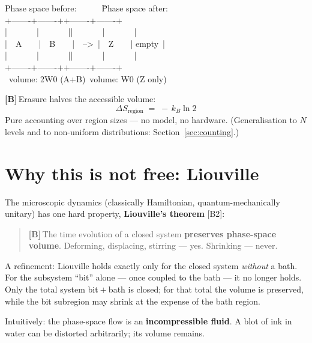 \documentclass[11pt,a4paper]{article}
\newcommand{\LB}{\textcolor{layB}{\textbf{\footnotesize\textsf{[B]}}}\,}
\begin{document}
\begin{center}
\begin{minipage}{0.78\textwidth}
\ttfamily\small
\begin{tabbing}
Phase space before:\ \ \ \ \ \ \=Phase space after:\\[0.3em]
+-------+-------+\>+-------+-------+\\
|\ \ \ \ \ \ \ |\ \ \ \ \ \ \ |\>|\ \ \ \ \ \ \ |\ \ \ \ \ \ \ |\\
|\ \ A\ \ \ \ |\ \ B\ \ \ \ |\ \ -->\ \>|\ \ Z\ \ \ \ | empty\ |\\
|\ \ \ \ \ \ \ |\ \ \ \ \ \ \ |\>|\ \ \ \ \ \ \ |\ \ \ \ \ \ \ |\\
+-------+-------+\>+-------+-------+\\
\ volume: 2W0 (A+B)\>\ volume: W0 (Z only)
\end{tabbing}
\end{minipage}
\end{center}

\LB Erasure halves the accessible volume:
\[
  \Delta S_{\text{region}} \;=\; -\,k_B \ln 2
\]
Pure accounting over region sizes --- no model, no hardware. (Generalisation to
$N$ levels and to non-uniform distributions: Section~\ref{sec:counting}.)

\section{Why this is not free: Liouville}
\label{sec:liouville}

The microscopic dynamics (classically Hamiltonian, quantum-mechanically unitary)
has one hard property, \textbf{Liouville's theorem} [B2]:

\begin{quote}
\LB The time evolution of a closed system \textbf{preserves phase-space volume}.
Deforming, displacing, stirring --- yes. Shrinking --- never.
\end{quote}

A refinement: Liouville holds exactly only for the closed system \emph{without} a
bath. For the subsystem “bit” alone --- once coupled to the bath --- it no longer
holds. Only the total system bit${}+{}$bath is closed; for that total the volume
is preserved, while the bit subregion may shrink at the expense of the bath
region.

Intuitively: the phase-space flow is an \textbf{incompressible fluid}. A blot of
ink in water can be distorted arbitrarily; its volume remains.
\end{document}
